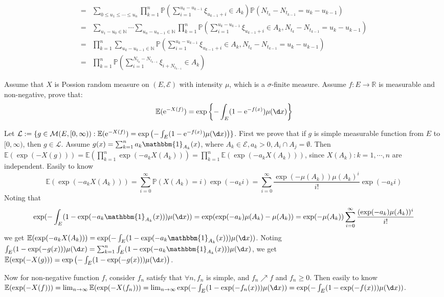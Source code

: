 \documentclass{ctexart}
\begin{document}
\begin{solution}
\begin{enumerate}
\begin{equation}
\begin{aligned}
          = & \sum_{0 \leq u_1\leq \cdots\leq u_n}\prod_{k=1}^{n} \mathbb{P}(\sum_{i= 1}^{u_k-u_{k-1}}\xi_{u_{k-1}+ i}  \in A_k)\mathbb{P}(N_{t_{k}}-N_{t_{k-1}}=u_k-u_{k-1})                         \\
          = & \sum_{u_1-u_{0} \in \mathbb{N}}\cdots \sum_{u_n-u_{n-1} \in \mathbb{N}}\prod_{k=1}^{n} \mathbb{P}(\sum_{i= 1}^{u_k-u_{k-1}}\xi_{u_{k-1}+ i}  \in A_k,N_{t_{k}}-N_{t_{k-1}}=u_k-u_{k-1}) \\
          = & \prod_{k=1}^{n} \sum_{u_k-u_{k-1} \in \mathbb{N}}\mathbb{P}(\sum_{i= 1}^{u_k-u_{k-1}}\xi_{u_{k-1}+ i}  \in A_k,N_{t_{k}}-N_{t_{k-1}}=u_k-u_{k-1})                                       \\
          = & \prod_{k=1}^n\mathbb{P}(\sum_{i=1}^{N_{t_k}-N_{t_{k-1}}}\xi_{i + N_{t_{k-1}}}  \in A_k)
        \end{aligned}
      \end{equation}
  \end{enumerate}
\end{solution}
\begin{problem}\label{pro:2}
  Assume that \(X\) is Possion random measure on \((E,\mathcal{E})\) with intensity \(\mu\), which is a \(\sigma\)-finite measure.
  Assume \(f:E \to \mathbb{R}\) is measurable and non-negative, prove that:
  \[
    \mathbb{E}(\mathrm{e}^{-X(f)})=\exp \left\{-\int_{E}(1-\mathrm{e}^{-f(x)}) \mu(\d x)\right\}
  \]
\end{problem}
\begin{solution}
  Let \(\mathcal{L}:=\{g \in \mathcal{M}(E,[0,\infty)): \mathbb{E}(\mathrm{e}^{-X(f)})=\exp\left(-\int_{E}(1-\mathrm{e}^{-f(x)}) \mu(\d x)\right) \}\).
  First we prove that if \(g\) is simple measurable function from \(E\) to \([0,\infty)\), then \(g \in \mathcal{L}\).
  Assume \(g(x)=\sum_{k=1}^{n} a_k\mathbbm{1}_{A_k}(x)\), where \(A_k \in \mathcal{E},a_k >0,A_i \cap A_j = \emptyset\).
  Then \(\mathbb{E}(\exp(-X(g)))=\mathbb{E}(\prod_{k=1}^{n} \exp(-a_k X(A_k)))=\prod_{k=1}^{n} \mathbb{E}(\exp(-a_k X(A_k)))\), since \(X(A_k):k=1,\cdots,n\) are independent.
  Easily to know
  \[
    \mathbb{E}(\exp(-a_k X(A_k)))=\sum_{i=0}^{\infty} \mathbb{P}(X(A_k)=i) \exp(-a_k i)=\sum_{i=0}^{\infty} \frac{\exp(-\mu(A_k))\mu(A_k)^i}{i!} \exp(-a_k i)
  \]
  Noting that
  \[
    \exp(-\int_{E}(1-\exp(-a_k\mathbbm{1}_{A_k}(x))) \mu(\d x))=\exp(\exp(-a_k) \mu(A_k) - \mu(A_k))=\exp(-\mu(A_k))\sum_{i=0}^{\infty} \frac{(\exp(-a_k) \mu(A_k))^i}{i!}
  \]
  we get \(\mathbb{E}(\exp(-a_k X(A_k)))=\exp(-\int_{E}(1-\exp(-a_k\mathbbm{1}_{A_k}(x))) \mu(\d x))\).
  Noting \(\int_{E}(1-\exp(-g(x))) \mu(\d x)=\sum_{k=1}^{n}\int_{E}(1-\exp(-a_k\mathbbm{1}_{A_k}(x))) \mu(\d x)\),
  we get \(\mathbb{E}(\exp(-X(g)))=\exp\left(-\int_{E}(1-\exp(-g(x))) \mu(\d x)\right)\).

  Now for non-negative function \(f\), consider \(f_n\) satisfy that \(\forall n,f_n\) is simple, and \(f_n \nearrow f \) and \(f_n \geq 0\).
  Then easily to know \(\mathbb{E}(\exp(-X(f)))=\lim_{n \to \infty}\mathbb{E}(\exp(-X(f_n)))=\lim_{n \to \infty}\exp(-\int_{E}(1-\exp(-f_n(x))) \mu(\d x))=\exp(-\int_{E}(1-\exp(-f(x))) \mu(\d x))\).
\end{solution}
\end{document}
